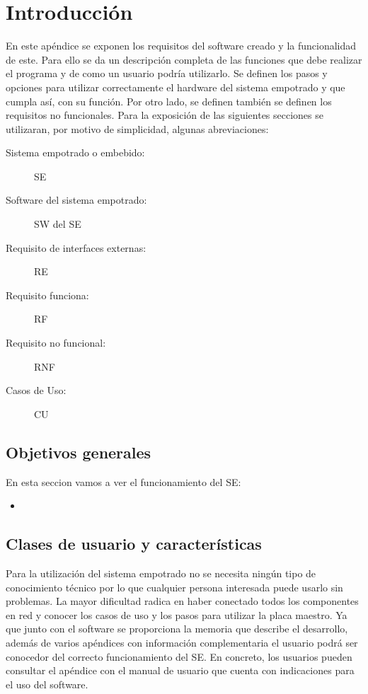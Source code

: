 
\section{Introducción}

En este apéndice se exponen los requisitos del software creado y la funcionalidad de este. Para ello se da un descripción completa de las funciones que debe realizar el programa y de como un usuario podría utilizarlo. Se definen los pasos y opciones para utilizar correctamente el hardware del sistema empotrado y que cumpla así, con su función. Por otro lado, se definen también se definen los requisitos no funcionales. 
Para la exposición de las siguientes secciones se utilizaran, por motivo de simplicidad, algunas abreviaciones:
\begin{description}
\item[Sistema empotrado o embebido:] SE
\item[Software del sistema empotrado:] SW del SE
\item[Requisito de interfaces externas:] RE
\item[Requisito funciona:] RF
\item[Requisito no funcional:] RNF
\item[Casos de Uso:] CU
\end{description}

\subsection{Objetivos generales}
En esta seccion vamos a ver el funcionamiento del SE:
\begin{itemize}
\item 
\end{itemize}

\subsection{Clases de usuario y características}
Para la utilización del sistema empotrado no se necesita ningún tipo de conocimiento técnico por lo que cualquier persona interesada puede usarlo sin problemas. La mayor dificultad radica en haber conectado todos los componentes en red y conocer los casos de uso y los pasos para utilizar la placa maestro. 
Ya que junto con el software se proporciona la memoria que describe el desarrollo,
además de varios apéndices con información complementaria el usuario podrá ser conocedor del correcto funcionamiento del SE. En concreto, los usuarios pueden consultar el apéndice con el manual de usuario que cuenta con indicaciones para el uso del software.


